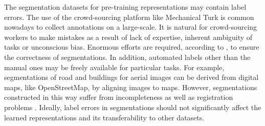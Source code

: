 

The segmentation datasets for pre-training representations may contain label errors.
The use of the crowd-sourcing platform like Mechanical Turk is common nowadays to collect annotations on a large-scale.
It is natural for crowd-sourcing workers to make mistakes as a result of lack of expertise, inherent ambiguity of tasks or unconscious bias.
Enormous efforts are required, according to  \cite{lin2014microsoft,everingham2015pascal}, to ensure the correctness of segmentations.
In addition, automated labels other than the manual ones may be freely available for particular tasks.
For example, segmentations of road and buildings for aerial images can be derived from digital maps, like OpenStreetMap, by aligning images to maps.
However, segmentations constructed in this way suffer from incompleteness as well as registration problems \cite{mnih2012learning}.
Ideally, label errors in segmentations should not significantly affect the learned representations and its transferability to other datasets.



